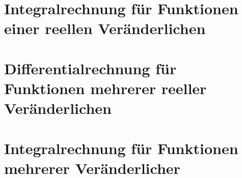 \documentclass{scrreprt}
\begin{document}
\chapter{Integralrechnung für Funktionen einer reellen Veränderlichen}


\chapter{Differentialrechnung für Funktionen mehrerer reeller Veränderlichen}


\chapter{Integralrechnung für Funktionen mehrerer Veränderlicher}

\end{document}
